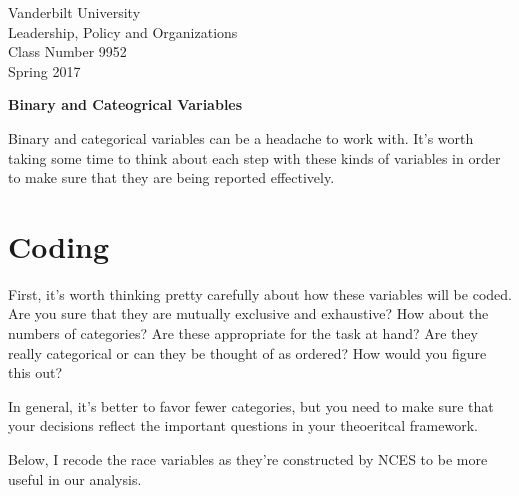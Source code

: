 \usepackage[margin= 1in]{geometry}
\usepackage[pdftex]{graphicx}
\usepackage{amsmath}
\usepackage{bibentry}
\usepackage{ccaption}
\usepackage{fourier}
\usepackage{stata}
\usepackage[colorlinks=true,
                      pdfstartview=FitV,
                      urlcolor=blue,
]{hyperref}

\usepackage{natbib}



\thispagestyle{empty}%


\setlength{\parskip}{1ex plus 0.5ex minus 0.2ex}

\setcounter{secnumdepth}{-2}



\begin{flushleft}
Vanderbilt University\\Leadership, Policy and Organizations\\Class Number 9952\\ Spring 2017
\end{flushleft}

\begin{center}
\textbf{Binary and Cateogrical Variables}
\end{center}


Binary and categorical variables can be a headache to work with. It's worth taking some time to think about each step 
with these kinds of variables in order to make sure that they are being reported effectively. 

\section{Coding}

First, it's worth thinking pretty carefully about how these variables
will be coded. Are you sure that they are mutually exclusive and
exhaustive? How about the numbers of categories? Are these appropriate
for the task at hand? Are they really categorical or can they be
thought of as ordered? How would you figure this out? 

In general, it's better to favor fewer categories, but you need to
make sure that your decisions reflect the important questions in your
theoeritcal framework. 

Below, I recode the race variables as they're constructed by NCES to
be more useful in our analysis. 

\begin{stlog}
  
\end{stlog}

